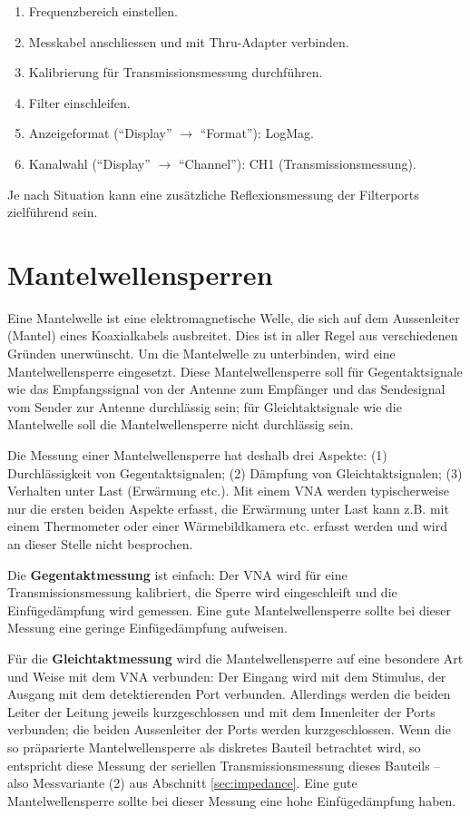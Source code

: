 \documentclass[twoside,a4paper,11pt,halfparskip,DIV=11,notitlepage]{scrartcl}
\begin{document}
\begin{enumerate}
    \item Frequenzbereich einstellen.
    \item Messkabel anschliessen und mit Thru-Adapter verbinden.
    \item Kalibrierung für Transmissionsmessung durchführen.
    \item Filter einschleifen.
    \item Anzeigeformat (``Display'' $\longrightarrow$ ``Format''): LogMag.
    \item Kanalwahl (``Display'' $\longrightarrow$ ``Channel''): CH1 (Transmissionsmessung).
\end{enumerate}

Je nach Situation kann eine zusätzliche Reflexionsmessung der Filterports zielführend sein.

\newpage %
\section{Mantelwellensperren}
Eine Mantelwelle ist eine elektromagnetische Welle, die sich auf dem Aussenleiter (Mantel) eines
Koaxialkabels ausbreitet. Dies ist in aller Regel aus verschiedenen Gründen
unerwünscht. Um die Mantelwelle zu unterbinden, wird eine Mantelwellensperre
eingesetzt. Diese Mantelwellensperre soll für Gegentaktsignale wie das
Empfangssignal von der Antenne zum Empfänger und das Sendesignal vom Sender
zur Antenne durchlässig sein; für Gleichtaktsignale wie die Mantelwelle soll
die Mantelwellensperre nicht durchlässig sein.

Die Messung einer Mantelwellensperre hat deshalb drei Aspekte:
(1) Durchlässigkeit von Gegentaktsignalen;
(2) Dämpfung von Gleichtaktsignalen;
(3) Verhalten unter Last (Erwärmung etc.).
Mit einem VNA werden typischerweise nur die ersten beiden Aspekte erfasst, die
Erwärmung unter Last kann z.B. mit einem Thermometer oder einer Wärmebildkamera
etc. erfasst werden und wird an dieser Stelle nicht besprochen.

Die \textbf{Gegentaktmessung} ist einfach: Der VNA wird für eine Transmissionsmessung
kalibriert, die Sperre wird eingeschleift und die Einfügedämpfung wird
gemessen. Eine gute Mantelwellensperre sollte bei dieser Messung eine geringe
Einfügedämpfung aufweisen.

Für die \textbf{Gleichtaktmessung} wird die Mantelwellensperre auf eine besondere
Art und Weise mit dem VNA verbunden: Der Eingang wird mit dem Stimulus,
der Ausgang mit dem detektierenden Port verbunden. Allerdings werden die
beiden Leiter der Leitung jeweils kurzgeschlossen und mit dem
Innenleiter der Ports verbunden; die beiden Aussenleiter der Ports werden
kurzgeschlossen. Wenn die so präparierte Mantelwellensperre als diskretes
Bauteil betrachtet wird, so entspricht diese Messung der seriellen
Transmissionsmessung dieses Bauteils -- also Messvariante (2) aus
Abschnitt \ref{sec:impedance}. Eine gute Mantelwellensperre
sollte bei dieser Messung eine hohe Einfügedämpfung haben.
\end{document}
